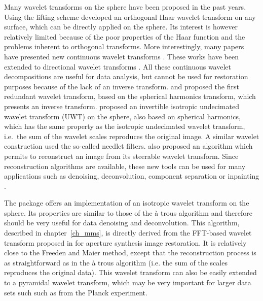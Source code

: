 Many wavelet transforms on the sphere have been proposed in the past years. Using the lifting scheme \citep{wave:sweldens95a} developed 
an orthogonal Haar wavelet transform on any surface, which can be directly applied on the sphere. Its interest is however relatively 
limited because of the poor properties of the Haar function and the problems inherent to orthogonal transforms. 
More interestingly, many papers have presented new continuous wavelet transforms \citep{wave:antoine99,wave:tenerio99,wave:cayon01,wave:holschneider96}. 
These works have been extended to directional wavelet transforms \citep{wave:antoine01,wave:hobson04}. All these continuous wavelet 
decompositions are useful for data analysis, but cannot be used for restoration purposes because of the lack of an inverse transform. 
\citep{freeden97} and \citep{freeden98} proposed the first redundant wavelet transform, based on the spherical harmonics transform, 
which presents an inverse transform. \citep{starck:sta05_2} proposed an invertible isotropic undecimated wavelet transform (UWT) 
on the sphere, also based on spherical harmonics, which has the same property as the isotropic undecimated wavelet  transform, i.e.\ the sum of the wavelet scales 
reproduces the original image. A similar wavelet construction \citep{marinucci08,fay08a,fay08} used the so-called needlet filters. 
\citep{wiaux08} also proposed an algorithm which permits to reconstruct an image from its steerable wavelet transform. Since reconstruction algorithms 
are available, these new tools can be used for many applications such as denoising, deconvolution, component separation 
\citep{starck:yassir05,bobin-gmca-cmb,delabrouille08} or inpainting \citep{inpainting:abrial06,starck:abrial08}.

The \mrs package offers an implementation of an isotropic wavelet transform on the sphere. Its properties are similar to those of the \og{}\`a trous \fg{} 
algorithm and therefore should be very useful for data denoising and deconvolution. This algorithm, described in chapter~\ref{ch_mms}, is directly derived
from the FFT-based wavelet transform proposed in \citep{starck:sta94_3} for aperture synthesis image restoration. It is relatively close to the Freeden and 
Maier \citep{freeden98} method, except that the reconstruction process is as straightforward as in the \og{}\`a trous \fg{} algorithm (i.e. the sum of the scales 
reproduces the original data). This wavelet transform can also be easily extended to a pyramidal wavelet transform, which may be very important for 
larger data sets such such as from the Planck experiment.

